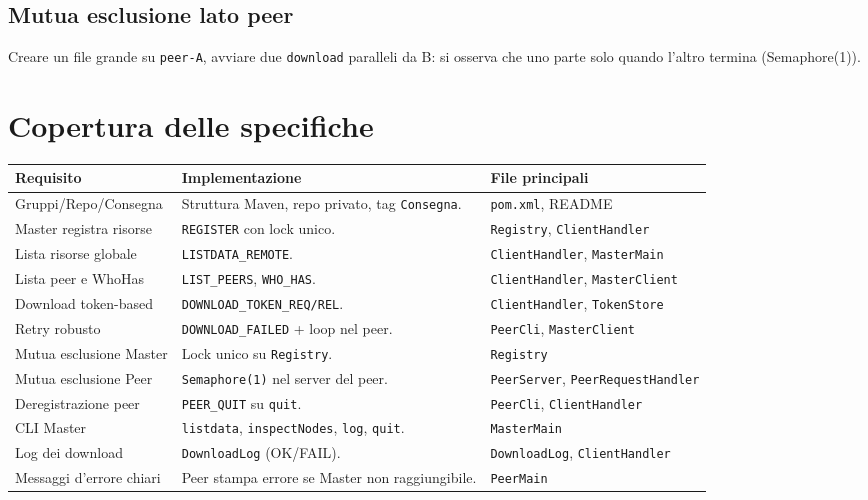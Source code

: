 \documentclass[a4paper,12pt]{article}
\begin{document}
\subsection*{Mutua esclusione lato peer}
Creare un file grande su \texttt{peer-A}, avviare due \texttt{download} paralleli da B: si osserva che uno parte solo quando l'altro termina (Semaphore(1)).

\section{Copertura delle specifiche}
\begin{longtable}{@{}p{4.5cm}p{6.8cm}p{4.5cm}@{}}
\toprule
\textbf{Requisito} & \textbf{Implementazione} & \textbf{File principali} \\
\midrule
Gruppi/Repo/Consegna & Struttura Maven, repo privato, tag \texttt{Consegna}. & \texttt{pom.xml}, README \\
Master registra risorse & \texttt{REGISTER} con lock unico. & \texttt{Registry}, \texttt{ClientHandler} \\
Lista risorse globale & \texttt{LISTDATA\_REMOTE}. & \texttt{ClientHandler}, \texttt{MasterMain} \\
Lista peer e WhoHas & \texttt{LIST\_PEERS}, \texttt{WHO\_HAS}. & \texttt{ClientHandler}, \texttt{MasterClient} \\
Download token-based & \texttt{DOWNLOAD\_TOKEN\_REQ/REL}. & \texttt{ClientHandler}, \texttt{TokenStore} \\
Retry robusto & \texttt{DOWNLOAD\_FAILED} + loop nel peer. & \texttt{PeerCli}, \texttt{MasterClient} \\
Mutua esclusione Master & Lock unico su \texttt{Registry}. & \texttt{Registry} \\
Mutua esclusione Peer & \texttt{Semaphore(1)} nel server del peer. & \texttt{PeerServer}, \texttt{PeerRequestHandler} \\
Deregistrazione peer & \texttt{PEER\_QUIT} su \texttt{quit}. & \texttt{PeerCli}, \texttt{ClientHandler} \\
CLI Master & \texttt{listdata}, \texttt{inspectNodes}, \texttt{log}, \texttt{quit}. & \texttt{MasterMain} \\
Log dei download & \texttt{DownloadLog} (OK/FAIL). & \texttt{DownloadLog}, \texttt{ClientHandler} \\
Messaggi d'errore chiari & Peer stampa errore se Master non raggiungibile. & \texttt{PeerMain} \\
\bottomrule
\end{longtable}
\end{document}

